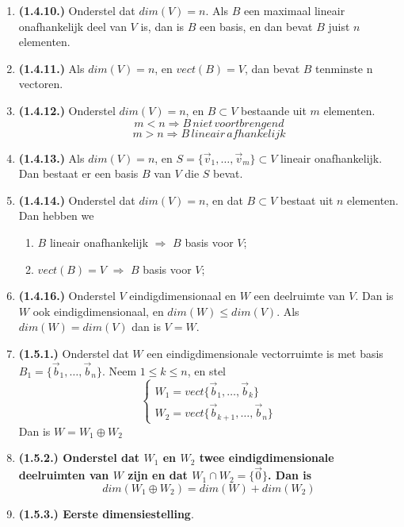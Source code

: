 \documentclass[12pt]{article}
\begin{document}
\begin{enumerate}
        \item \textbf{(1.4.10.)} Onderstel dat $dim(V)=n$. Als $B$ een maximaal lineair onafhankelijk deel van $V$ is, dan is $B$ een basis, en dan bevat $B$ juist $n$ elementen.
        \item \textbf{(1.4.11.)} Als $dim(V)=n$, en $vect(B)=V$, dan bevat $B$ tenminste n vectoren.
        \item \textbf{(1.4.12.)} Onderstel $dim(V)=n$, en $B \subset V$ bestaande uit $m$ elementen. $$m<n \Rightarrow B \, niet \, voortbrengend$$ $$m>n \Rightarrow B \, lineair \, afhankelijk$$
        \item \textbf{(1.4.13.)} Als $dim(V)=n$, en $S= \{\vec{v}_1,\dots,\vec{v}_m\}\subset V$ lineair onafhankelijk. Dan bestaat er een basis $B$ van $V$ die $S$ bevat.
        \item \textbf{(1.4.14.)} Onderstel dat $dim(V)=n$, en dat $B \subset V$ bestaat uit $n$ elementen. Dan hebben we \begin{enumerate}
            \item $B$ lineair onafhankelijk $\Rightarrow$ $B$ basis voor $V$;
            \item $vect(B)=V$ $\Rightarrow$ $B$ basis voor $V$;
        \end{enumerate}
        \item \textbf{(1.4.16.)} Onderstel $V$ eindigdimensionaal en $W$ een deelruimte van $V$. Dan is $W$ ook eindigdimensionaal, en $dim(W) \le dim(V)$. Als $dim(W) = dim(V)$ dan is $V=W$.
        \item \textbf{(1.5.1.)} Onderstel dat $W$ een eindigdimensionale vectorruimte is met basis $B_1=\{\vec{b}_1,\dots,\vec{b}_n\}$. Neem $1 \le k \le n$, en stel $$\begin{cases} W_1 = vect\{\vec{b}_1,\dots,\vec{b}_k\} \\ W_2 = vect\{\vec{b}_{k+1},\dots,\vec{b}_n\} \end{cases}$$ Dan is $W=W_1 \oplus W_2$
        \item \textbf{\textbf{(1.5.2.)} Onderstel dat $W_1$ en $W_2$ twee eindigdimensionale deelruimten van $W$ zijn en dat $W_1 \cap W_2 = \{ \vec{0} \}$. Dan is $$dim(W_1 \oplus W_2) = dim(W)+dim(W_2)$$}
        \item \textbf{\textbf{(1.5.3.)} Eerste dimensiestelling}.
    \end{enumerate}
\end{document}
